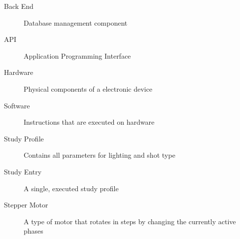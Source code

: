 \begin{description}
        \item[Back End] Database management component
        \item[API] Application Programming Interface
        \item[Hardware] Physical components of a electronic device
        \item[Software] Instructions that are executed on hardware
        \item[Study Profile] Contains all parameters for lighting and shot type
        \item[Study Entry] A single, executed study profile
        \item[Stepper Motor] A type of motor that rotates in steps by changing the currently active phases
\end{description}